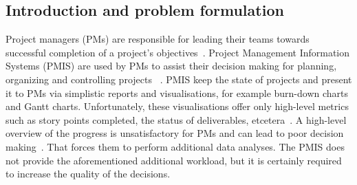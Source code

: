\documentclass[a4paper, 12pt]{article}
\begin{document}
\subsection{Introduction and problem formulation}


Project managers (PMs) are responsible for leading their teams towards successful completion of a project’s objectives~\cite{institute2017guide}. Project Management Information Systems (PMIS) are used by PMs to assist their decision making for planning, organizing and controlling projects ~\cite{CANIELS2012162}. PMIS keep the state of projects and present it to PMs via simplistic reports and visualisations, for example burn-down charts and Gantt charts. Unfortunately, these visualisations offer only high-level metrics such as story points completed, the status of deliverables, etcetera~\cite{institute2017guide}. A high-level overview of the progress is unsatisfactory for PMs and can lead to poor decision making~\cite{CANIELS2012162}. That forces them to perform additional data analyses. The PMIS does not provide the aforementioned additional workload, but it is certainly required to increase the quality of the decisions.



\end{document}
